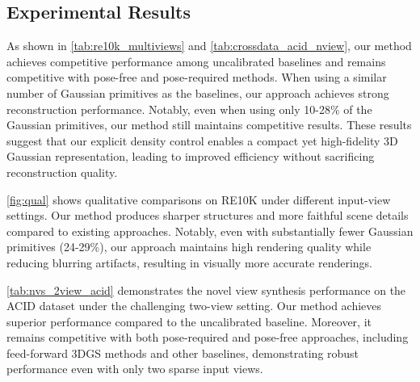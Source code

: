 \subsection{Experimental Results}
\vspace{-3pt}
As shown in \cref{tab:re10k_multiviews} and \cref{tab:crossdata_acid_nview}, our method achieves competitive performance among uncalibrated baselines and remains competitive with pose-free and pose-required methods. When using a similar number of Gaussian primitives as the baselines, our approach achieves strong reconstruction performance. Notably, even when using only 10-28\% of the Gaussian primitives, our method still maintains competitive results. These results suggest that our explicit density control enables a compact yet high-fidelity 3D Gaussian representation, leading to improved efficiency without sacrificing reconstruction quality.

\cref{fig:qual} shows qualitative comparisons on RE10K under different input-view settings. Our method produces sharper structures and more faithful scene details compared to existing approaches. Notably, even with substantially fewer Gaussian primitives (24-29\%), our approach maintains high rendering quality while reducing blurring artifacts, resulting in visually more accurate renderings.

\cref{tab:nvs_2view_acid} demonstrates the novel view synthesis performance on the ACID dataset under the challenging two-view setting. Our method achieves superior performance compared to the uncalibrated baseline. Moreover, it remains competitive with both pose-required and pose-free approaches, including feed-forward 3DGS methods and other baselines, demonstrating robust performance even with only two sparse input views.